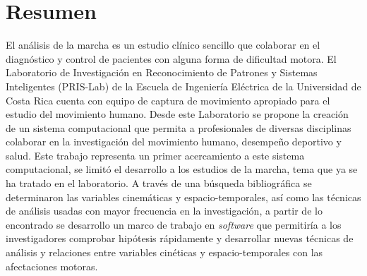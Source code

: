 \chapter{Resumen}

El análisis de la marcha es un estudio clínico sencillo que colaborar en el diagnóstico y control de pacientes con alguna forma de dificultad motora. El Laboratorio de Investigación en Reconocimiento de Patrones y Sistemas Inteligentes (PRIS-Lab) de la Escuela de Ingeniería Eléctrica de la Universidad de Costa Rica cuenta con equipo de captura de movimiento apropiado para el estudio del movimiento humano. Desde este Laboratorio se propone la creación de un sistema computacional que permita a profesionales de diversas disciplinas colaborar en la investigación del movimiento humano, desempeño deportivo y salud. Este trabajo representa un primer acercamiento a este sistema computacional, se limitó el desarrollo a los estudios de la marcha, tema que ya se ha tratado en el laboratorio. A través de una búsqueda bibliográfica se determinaron las variables cinemáticas y espacio-temporales, así como las técnicas de análisis usadas con mayor frecuencia en la investigación, a partir de lo encontrado se desarrollo un marco de trabajo en \emph{software} que permitiría a los investigadores comprobar hipótesis rápidamente y desarrollar nuevas técnicas de análisis y relaciones entre variables cinéticas y espacio-temporales con las afectaciones motoras. 
